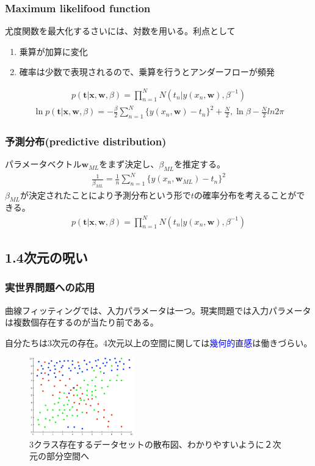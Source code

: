 \documentclass[dvipdfmx]{beamer}
\theoremstyle{definition}
\begin{document}
\begin{frame}
  \frametitle{Maximum likelifood function}
  尤度関数を最大化するさいには、対数を用いる。利点として
  \begin{enumerate}
    \item 乗算が加算に変化
    \item 確率は少数で表現されるので、乗算を行うとアンダーフローが頻発
  \end{enumerate}
  \begin{gather*}
    p(\bm{t}|\bm{x},\bm{w},\beta)=\prod_{n=1}^{N} N(t_n | y(x_n,\bm{w}),\beta^{-1})
  \end{gather*}
  \begin{gather*}
    \ln{p(\bm{t}|\bm{x},\bm{w},\beta)} = -\frac{\beta}{2}\sum_{n=1}^{N} \{ y(x_n,\bm{w}) - t_n \}^2 + \frac{N}{2},\ln{\beta} -\frac{N}{2}ln{2\pi}
  \end{gather*}
\end{frame}

\begin{frame}
  \frametitle{予測分布(predictive distribution)}
  パラメータベクトル$\bm{w}_{ML}$をまず決定し、$\beta_{ML}$を推定する。
  \begin{gather*}
    \frac{1}{\beta_{ML}}=\frac{1}{n} \sum_{n=1}^{N} \{ y(x_n,\bm{w}_{ML})- t_n \}^2
  \end{gather*}
  $\beta_{ML}$が決定されたことにより予測分布という形で$t$の確率分布を考えることができる。
  \begin{gather*}
    p(\bm{t}|\bm{x},\bm{w},\beta)=\prod_{n=1}^{N} N(t_n | y(x_n,\bm{w}),\beta^{-1})
  \end{gather*}
\end{frame}

\subsection{1.4次元の呪い}
\begin{frame}
  \frametitle{実世界問題への応用}
  曲線フィッティングでは、入力パラメータは一つ。現実問題では入力パラメータは複数個存在するのが当たり前である。
  
  自分たちは3次元の存在。4次元以上の空間に関しては\textcolor{blue}{幾何的直感}は働きづらい。
  \begin{figure}[htb]
    \centering
    \includegraphics[width=4.5cm,clip]{res/curse_dim.eps}
    \caption{3クラス存在するデータセットの散布図、わかりやすいように２次元の部分空間へ}
  \end{figure}
\end{frame}
\end{document}

